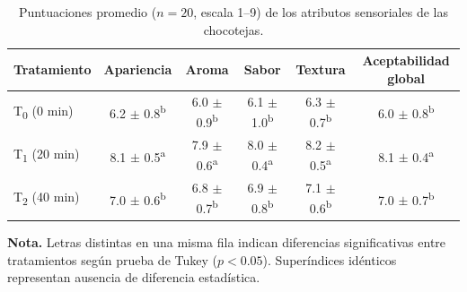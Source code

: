 \documentclass[manuscript,screen,review]{acmart}
\begin{document}
\begin{table}[H]
  \centering
  \caption{Puntuaciones promedio ($n=20$, escala 1--9) de los atributos sensoriales de las chocotejas.}
  \label{tab:sensorial}
  \begin{tabular}{lccccc}
    \toprule
    \textbf{Tratamiento} & \textbf{Apariencia} & \textbf{Aroma} & \textbf{Sabor} & \textbf{Textura} & \textbf{Aceptabilidad global} \\
    \midrule
    T\textsubscript{0} (0 min)  & 6.2 $\pm$ 0.8\textsuperscript{b} & 6.0 $\pm$ 0.9\textsuperscript{b} & 6.1 $\pm$ 1.0\textsuperscript{b} & 6.3 $\pm$ 0.7\textsuperscript{b} & 6.0 $\pm$ 0.8\textsuperscript{b} \\
    T\textsubscript{1} (20 min) & 8.1 $\pm$ 0.5\textsuperscript{a} & 7.9 $\pm$ 0.6\textsuperscript{a} & 8.0 $\pm$ 0.4\textsuperscript{a} & 8.2 $\pm$ 0.5\textsuperscript{a} & 8.1 $\pm$ 0.4\textsuperscript{a} \\
    T\textsubscript{2} (40 min) & 7.0 $\pm$ 0.6\textsuperscript{b} & 6.8 $\pm$ 0.7\textsuperscript{b} & 6.9 $\pm$ 0.8\textsuperscript{b} & 7.1 $\pm$ 0.6\textsuperscript{b} & 7.0 $\pm$ 0.7\textsuperscript{b} \\
    \bottomrule
  \end{tabular}
  \vspace{2mm}
  \begin{minipage}{0.9\linewidth}
  \footnotesize
  \textbf{Nota.} Letras distintas en una misma fila indican diferencias significativas entre tratamientos según prueba de Tukey ($p<0.05$). Superíndices idénticos representan ausencia de diferencia estadística.
  \end{minipage}
\end{table}
\end{document}
